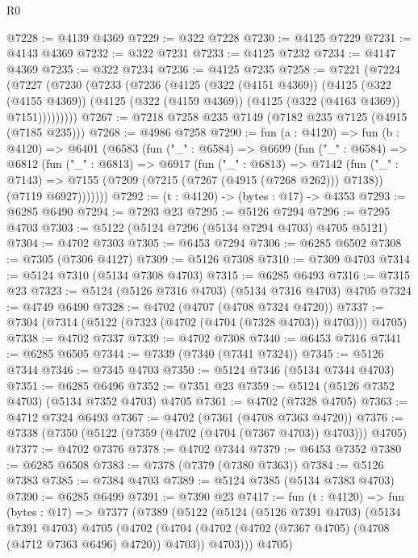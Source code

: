 \begin{lexlean}{R0}
\begin{coremodule}
@7228 := @4139 @4369
@7229 := @322 @7228
@7230 := @4125 @7229
@7231 := @4143 @4369
@7232 := @322 @7231
@7233 := @4125 @7232
@7234 := @4147 @4369
@7235 := @322 @7234
@7236 := @4125 @7235
@7258 := @7221
    (@7224
      (@7227
        (@7230
          (@7233
            (@7236
              (@4125
                (@322 (@4151 @4369))
                (@4125
                  (@322 (@4155 @4369))
                  (@4125 (@322 (@4159 @4369)) (@4125 (@322 (@4163 @4369)) @7151)))))))))
@7267 := @7218 @7258 @235 @7149 (@7182 @235 @7125 (@4915 (@7185 @235)))
@7268 := @4986 @7258
@7290 := fun (a : @4120) =>
  fun (b : @4120) =>
  @6401
    (@6583
      (fun ("_" : @6584) =>
      @6699
        (fun ("_" : @6584) =>
        @6812
          (fun ("_" : @6813) =>
          @6917
            (fun ("_" : @6813) =>
            @7142
              (fun ("_" : @7143) =>
              @7155 (@7209 (@7215 (@7267 (@4915 (@7268 @262))) @7138)) (@7119 @6927)))))))
@7292 := (t : @4120) -> (bytes : @17) -> @4353
@7293 := @6285 @6490
@7294 := @7293 @23
@7295 := @5126 @7294
@7296 := @7295 @4703
@7303 := @5122 (@5124 @7296 (@5134 @7294 @4703) @4705 @5121)
@7304 := @4702 @7303
@7305 := @6453 @7294
@7306 := @6285 @6502
@7308 := @7305 (@7306 @4127)
@7309 := @5126 @7308
@7310 := @7309 @4703
@7314 := @5124 @7310 (@5134 @7308 @4703)
@7315 := @6285 @6493
@7316 := @7315 @23
@7323 := @5124 (@5126 @7316 @4703) (@5134 @7316 @4703) @4705
@7324 := @4749 @6490
@7328 := @4702 (@4707 (@4708 @7324 @4720))
@7337 := @7304 (@7314 (@5122 (@7323 (@4702 (@4704 (@7328 @4703)) @4703))) @4705)
@7338 := @4702 @7337
@7339 := @4702 @7308
@7340 := @6453 @7316
@7341 := @6285 @6505
@7344 := @7339 (@7340 (@7341 @7324))
@7345 := @5126 @7344
@7346 := @7345 @4703
@7350 := @5124 @7346 (@5134 @7344 @4703)
@7351 := @6285 @6496
@7352 := @7351 @23
@7359 := @5124 (@5126 @7352 @4703) (@5134 @7352 @4703) @4705
@7361 := @4702 (@7328 @4705)
@7363 := @4712 @7324 @6493
@7367 := @4702 (@7361 (@4708 @7363 @4720))
@7376 := @7338 (@7350 (@5122 (@7359 (@4702 (@4704 (@7367 @4703)) @4703))) @4705)
@7377 := @4702 @7376
@7378 := @4702 @7344
@7379 := @6453 @7352
@7380 := @6285 @6508
@7383 := @7378 (@7379 (@7380 @7363))
@7384 := @5126 @7383
@7385 := @7384 @4703
@7389 := @5124 @7385 (@5134 @7383 @4703)
@7390 := @6285 @6499
@7391 := @7390 @23
@7417 := fun (t : @4120) =>
  fun (bytes : @17) =>
  @7377
    (@7389
      (@5122
        (@5124
          (@5126 @7391 @4703)
          (@5134 @7391 @4703)
          @4705
          (@4702
            (@4704 (@4702 (@4702 (@7367 @4705) (@4708 (@4712 @7363 @6496) @4720)) @4703))
            @4703)))
      @4705)

\end{coremodule}
\end{lexlean}
